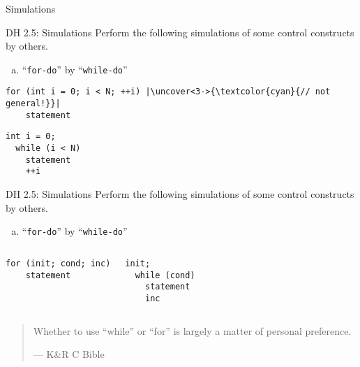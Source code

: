 \begin{frame}{}
  \centerline{\LARGE Simulations}
\end{frame}

\begin{frame}[fragile]{}
  \begin{exampleblock}{DH 2.5: Simulations}
    Perform the following simulations of some control constructs by others.
    \begin{enumerate}[(a)]
      \item ``\texttt{for-do}'' by ``\texttt{while-do}''
    \end{enumerate}
  \end{exampleblock}

  \vspace{0.40cm}
  \pause
  \begin{lstlisting}[style = Cstyle, backgroundcolor = \color{teal!10!lightgray}]
  for (int i = 0; i < N; ++i) |\uncover<3->{\textcolor{cyan}{// not general!}}|
    statement
  \end{lstlisting}

  \vspace{0.20cm}
  \begin{lstlisting}[style = Cstyle]
  int i = 0;
  while (i < N)
    statement
    ++i
  \end{lstlisting}
\end{frame}
\begin{frame}[fragile]{}
  \begin{exampleblock}{DH 2.5: Simulations}
    Perform the following simulations of some control constructs by others.
    \begin{enumerate}[(a)]
      \item ``\texttt{for-do}'' by ``\texttt{while-do}''
    \end{enumerate}
  \end{exampleblock}

  \begin{columns}
      \begin{lstlisting}[style = Cstyle, backgroundcolor = \color{teal!10!lightgray}]
  for (init; cond; inc)
    statement
      \end{lstlisting}
      \begin{lstlisting}[style = Cstyle]
  init;
  while (cond)
    statement
    inc
      \end{lstlisting}
  \end{columns}

  \vspace{0.50cm}
  \pause
  \begin{quote}
    Whether to use ``while'' or ``for'' is largely a matter of personal preference.
     
    \hfill --- K\&R C Bible
  \end{quote}
\end{frame}

